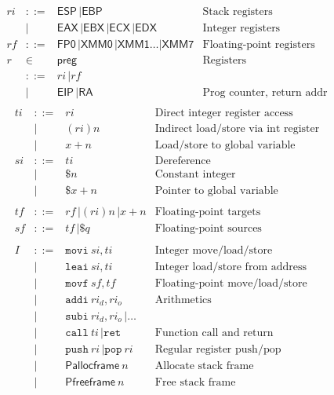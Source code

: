 \[
\begin{array}{llll}
\mathit{ri}  & ::= & \mathsf{ESP} \, | \mathsf{EBP} \, & \text{Stack registers} \\
& | & \mathsf{EAX} \, | \mathsf{EBX} \, | \mathsf{ECX} \, | \mathsf{EDX} & \text{Integer registers} \\
\mathit{rf} & ::= & \mathsf{FP0} \, | \mathsf{XMM0} \, | \mathsf{XMM1} \dots | \mathsf{XMM7} & \text{Floating-point registers} \\
r & \in & \textsf{preg} & \text{Registers} \\
 & ::= & \mathit{ri} \, | \mathit{rf} \\
& | & \mathsf{EIP} \, | \mathsf{RA} & \text{Prog counter, return addr} \\
\end{array}
\]
\[
\begin{array}{llll}
\mathit{ti} & ::= & \mathit{ri} & \text{Direct integer register access} \\
& | & (\mathit{ri})n & \text{Indirect load/store via int register} \\
& | & x+n & \text{Load/store to global variable} \\
\mathit{si} & ::= & \mathit{ti} & \text{Dereference} \\
& | & \$n & \text{Constant integer} \\
& | & \$x+n & \text{Pointer to global variable} \\
\\
\mathit{tf} & ::= & \mathit{rf} \, | (\mathit{ri})n \, | x+n & \text{Floating-point targets} \\
\mathit{sf} & ::= & \mathit{tf} \, | \$q \, & \text{Floating-point sources} \\
\\
\mathit{I} & ::= & \mathtt{movi} ~ \mathit{si}, \mathit{ti} & \text{Integer move/load/store} \\
& | & \mathtt{leai} ~ \mathit{si}, \mathit{ti} & \text{Integer load/store from address} \\
& | & \mathtt{movf} ~ \mathit{sf}, \mathit{tf} & \text{Floating-point move/load/store} \\
& | & \mathtt{addi} ~ \mathit{ri}_d, \mathit{ri}_o & \text{Arithmetics} \\
& | & \mathtt{subi} ~ \mathit{ri}_d, \mathit{ri}_o \, | \dots \\
& | & \mathtt{call} ~ \mathit{ti} \, | \mathtt{ret} & \text{Function call and return} \\
& | & \mathtt{push} ~ \mathit{ri} \, | \mathtt{pop} ~ \mathit{ri} & \text{Regular register push/pop} \\
& | & \mathsf{Pallocframe} ~ n & \text{Allocate stack frame} \\
& | & \mathsf{Pfreeframe} ~ n & \text{Free stack frame}
\end{array}
\]

